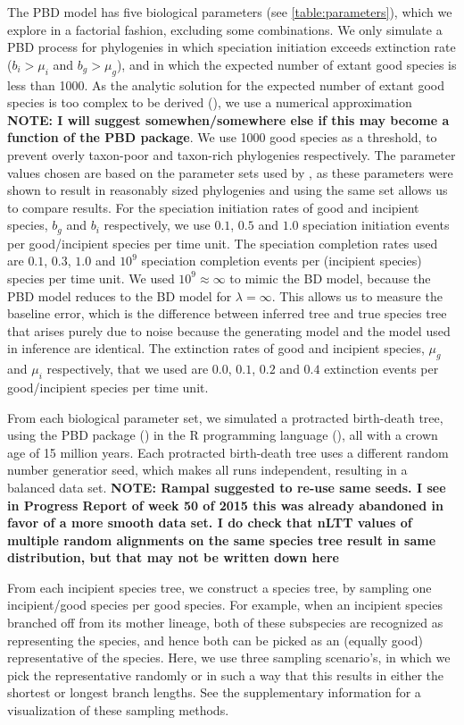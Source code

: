 \documentclass{article}
\begin{document}
The PBD model has five biological parameters (see \ref{table:parameters}), 
which we explore in a factorial fashion, excluding some combinations. 
We only simulate a PBD process for phylogenies in which
speciation initiation exceeds extinction rate ($b_i > \mu_i$ and $b_g > \mu_g$),
and in which the expected number of extant good species is less than 1000.
As the analytic solution for the expected number of extant good species 
is too complex to be derived (\cite{etienne_and_rosindell_2012}),
we use a numerical approximation \textbf{NOTE: I will suggest somewhen/somewhere else if this
may become a function of the PBD package}.
We use 1000 good species as a threshold, to prevent overly taxon-poor and taxon-rich phylogenies respectively.
The parameter values chosen are based on the parameter sets used by 
\cite{etienne2014}, as these parameters were shown to result in reasonably
sized phylogenies and using the same set allows us to compare results. 
For the speciation initiation rates of good and incipient species, $b_g$ and $b_i$ 
respectively, we use $0.1$, $0.5$ and $1.0$ speciation initiation events per good/incipient species per time unit.
The speciation completion rates used are $0.1$, $0.3$, $1.0$ and $10^9$ speciation completion
events per (incipient species) species per time unit. We used $10^9 \approx \infty$
to mimic the BD model, because the PBD model reduces to the BD model for $\lambda = \infty$.
This allows us to measure the baseline error, 
which is the difference between inferred tree and true species tree that arises purely due to noise 
because the generating model and the model used in inference are identical.
The extinction rates of good and incipient species, $\mu_g$ and $\mu_i$ respectively, 
that we used are $0.0$, $0.1$, $0.2$ and $0.4$ 
extinction events per good/incipient species per time unit.

From each biological parameter set, we simulated a protracted birth-death tree,
using the PBD package (\cite{pbd}) in the R programming language (\cite{r}), 
all with a crown age of 15 million years.
Each protracted birth-death tree uses a different random number
generatior seed, which makes all runs independent, resulting in a balanced 
data set. \textbf{NOTE: Rampal suggested to re-use same seeds. I see in Progress
Report of week 50 of 2015 this was already abandoned in favor of a more smooth data set.
I do check that nLTT values of multiple random alignments on the same species tree
result in same distribution, but that may not be written down here}

From each incipient species tree, we construct a species tree,
by sampling one incipient/good species per good species. 
For example, when an
incipient species branched off from its mother lineage, 
both of these subspecies are recognized as representing the species, 
and hence both can be picked as an (equally good) representative of the species. 
Here, we use three sampling scenario's,
in which we pick the representative randomly or in such a way that this
results in either the shortest or longest branch lengths. 
See the supplementary information for a visualization of these sampling methods.
\end{document}
